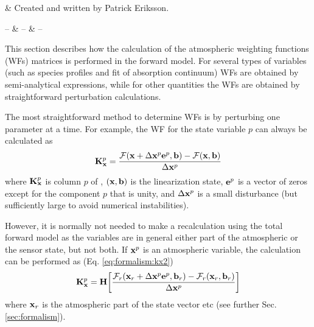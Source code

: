 %
%
 \label{sec:wfuns}


%
%
 & Created and written by Patrick Eriksson.\\
\stophistory


%
%
%
\startsymbols
  -- & -- & -- \\
 \label{symtable:wfuns}     
\stopsymbols



%
%
This section describes how the calculation of the atmospheric weighting
functions (WFs) matrices is performed in the forward model. For
several types of variables (such as species profiles and fit of
absorption continuum) WFs are obtained by semi-analytical expressions,
while for other quantities the WFs are obtained by straightforward
perturbation calculations.



 \label{sec:wfuns:approaches}

  The most straightforward method to determine WFs is by perturbing
  one parameter at a time. For example, the WF for the state variable
  $p$ can always be calculated as
  \begin{equation}
    \mathbf{K}_{\mathbf{x}}^p = \frac{\mathcal{F}(\mathbf{x}+\Delta\mathbf{x}^p\mathbf{e}^p,\mathbf{b})-\mathcal{F}(\mathbf{x},\mathbf{b})}
                                     {\Delta\mathbf{x}^p}
   \label{eq:wfuns:perturb}
  \end{equation}
  where $\mathbf{K}_{\mathbf{x}}^p$ is column $p$ of \Kx, $(\mathbf{x},\mathbf{b})$ is the
  linearization state, $\mathbf{e}^p$ is a vector of zeros except for the
  component $p$ that is unity, and $\Delta\mathbf{x}^p$ is a small disturbance
  (but sufficiently large to avoid numerical instabilities).
  
  However, it is normally not needed to make a recalculation using the
  total forward model as the variables are in general either part of the
  atmospheric or the sensor state, but not both. If $\mathbf{x}^p$ is an atmospheric
  variable, the calculation can be performed as (Eq. \ref{eq:formalism:kx2})
  \begin{equation}
    \mathbf{K}_{\mathbf{x}}^p = \mathbf{H} \bigg[
    \frac{\mathcal{F}_r(\mathbf{x}_r+\Delta\mathbf{x}^p\mathbf{e}^p,\mathbf{b}_r)-
           \mathcal{F}_r(\mathbf{x}_r,\mathbf{b}_r)}  {\Delta\mathbf{x}^p} \bigg]
   \label{eq:wfuns:Hpert}
  \end{equation}
  where $\mathbf{x}_r$ is the atmospheric part of the state vector etc (see
  further Sec. \ref{sec:formalism}).
 


